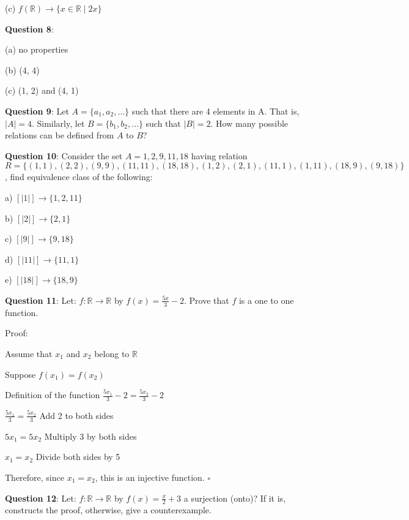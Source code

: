 \documentclass{article} %
\newcommand{\question}[2][]{\begin{flushleft}
        \textbf{Question #1}: #2
\end{flushleft}}
\begin{document}
    (c) $f(\mathbb{R}) \rightarrow \{ x \in \mathbb{R} \mid 2x \}$

    \question[8]{}

    (a) no properties

    (b) (4, 4)

    (c) (1, 2) and (4, 1)

    \question[9]{Let $A = \{a_1, a_2, \ldots \}$ such that there are 4 elements in A. That is, $|A| = 4$. Similarly,
    let $B = \{b_1, b_2, \ldots \}$ such that $|B| = 2$. How many possible relations can be defined from $A$ to $B$?}



    \question[10]{Consider the set $A = {1, 2, 9, 11, 18}$ having relation
    $R = \{(1, 1), (2, 2), (9, 9), (11, 11), (18, 18), (1, 2), (2, 1), (11, 1), (1, 11), (18, 9), (9, 18) \}$, find 
    equivalence class of the following:}

    a) $[|1|] \rightarrow \{1, 2, 11\}$

    b) $[|2|] \rightarrow \{2, 1\}$

    c) $[|9|] \rightarrow \{9, 18\}$

    d) $[|11|] \rightarrow \{11, 1\}$

    e) $[|18|] \rightarrow \{18, 9\}$

    \question[11]{Let: $f: \mathbb{R} \rightarrow \mathbb{R}$ by $f(x) = \frac{5x}{3} - 2$. Prove that $f$ is a one to one function.}

    Proof:

    Assume that $x_1$ and $x_2$ belong to $\mathbb{R}$

    Suppose $f(x_1) = f(x_2)$

    \vspace*{0.1cm}

    Definition of the function $\frac{5x_1}{3} - 2 = \frac{5x_2}{3} - 2$

    \vspace*{0.1cm}

    \tabto*{5.15cm} $\frac{5x_1}{3} = \frac{5x_2}{3}$ \tabto*{8cm} Add 2 to both sides

    \tabto*{5.15cm} $5x_1 = 5x_2$ \tabto*{8cm} Multiply 3 by both sides

    \tabto*{5.33cm} $x_1 = x_2$ \tabto*{8cm} Divide both sides by 5

    Therefore, since $x_1 = x_2$, this is an injective function. $\square$

    \question[12]{Let: $f: \mathbb{R} \rightarrow \mathbb{R}$ by $f(x) = \frac{x}{2} + 3$ a surjection (onto)? If it is, constructs the proof, 
    otherwise, give a counterexample.}
\end{document}

